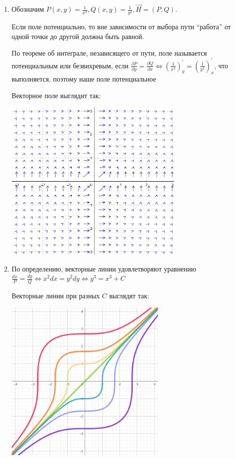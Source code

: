 \begin{enumerate}
    \item Обозначим $\displaystyle P(x, y) = \frac{1}{x^2}, Q(x, y) = \frac{1}{y^2}, \overrightarrow{H} = (P, Q)$.

    Если поле потенциально, то вне зависимости от выбора пути \enquote{работа} от одной точки до другой должна быть равной.

    По теореме об интеграле, независящего от пути,
    поле называется потенциальным или безвихревым, если $\frac{\partial P}{\partial y} = \frac{\partial Q}{\partial x} \Longleftrightarrow \left(\frac{1}{x^2}\right)_y^\prime = \left(\frac{1}{y^2}\right)_x^\prime$, что выполняется, поэтому наше поле потенциальное

    Векторное поле выглядит так:

    \begin{center}
        \includegraphics[height=80mm]{images/4a1}
    \end{center}

    \item По определению, векторные линии удовлетворяют уравнению $\frac{dx}{P} = \frac{dy}{Q} \Longleftrightarrow x^2 dx = y^2 dy \Longleftrightarrow y^3 = x^3 + C$

    Векторные линии при разных $C$ выглядят так:

    \begin{center}
        \includegraphics[height=80mm]{images/4b1}
    \end{center}


\end{enumerate}
